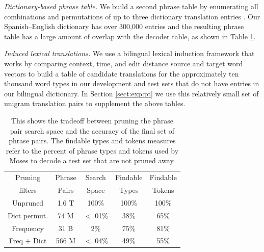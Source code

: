 \documentclass[11pt]{article}
\newcommand{\mnote}[1]{\marginpar{%
  \vskip-\baselineskip
  \raggedright\footnotesize
  \itshape\hrule\smallskip\tiny{#1}\par\smallskip\hrule}}
\newcommand{\mtodo}[1]{\mnote{\textcolor{red}{#1}}}
\newcommand{\paraheader}[1]{\vskip 0.05in \noindent\emph{#1}}
\begin{document}
\paraheader{Dictionary-based phrase table.}\mtodo{Chris had a citation for this method} We build a second phrase table by enumerating all combinations and permutations of up to three dictionary translation entries \cite{garera08a}. Our Spanish--English dictionary has over 300,000 entries and the resulting phrase table has a large amount of overlap with the decoder table, as shown in Table \ref{table:prune}. %

\paraheader{Induced lexical translations.} We use a bilingual lexical induction framework that works by comparing context, time, and edit distance source and target word vectors to build a table of candidate translations for the approximately ten thousand word types in our development and test sets that do not have entries in our bilingual dictionary. In Section \ref{sect:exp:pt} we use this relatively small set of unigram translation pairs to supplement the above tables.


\begin{table}
\small
\begin{center}
\begin{tabular}{|c|c|c|c|c|}
\hline
Pruning 	& Phrase	& Search & 	Findable 	& Findable \\
filters	& Pairs	&  Space & Types 	&  Tokens \\
\hline
Unpruned & 1.6 T & 100\% & 100\% & 100\% \\
Dict permut. & 74 M & $<$.01\% & 38\% & 65\% \\
Frequency &  31 B & 2\% & 75\% & 81\% \\
Freq + Dict & 566 M & $<$.04\% & 49\% & 55\% \\
\hline
\end{tabular}
\caption{This shows the tradeoff between pruning the phrase pair search space and the accuracy of the final set of phrase pairs. The findable types and tokens measures refer to the percent of phrase types and tokens used by Moses to decode a test set that are not pruned away. }\label{table:prune}
\end{center}
\end{table}
\end{document}
